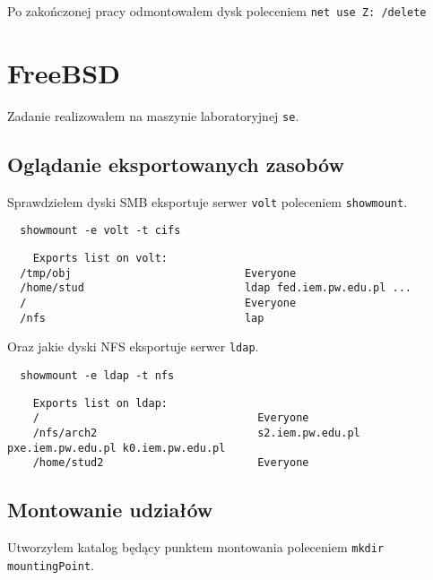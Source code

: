 \documentclass{article} %
\begin{document}
Po zakończonej pracy odmontowałem dysk poleceniem \texttt{net use Z: /delete}

\section{FreeBSD}
Zadanie realizowałem na maszynie laboratoryjnej \texttt{se}.

\subsection{Oglądanie eksportowanych zasobów}
Sprawdziełem dyski SMB eksportuje serwer \texttt{volt} poleceniem \texttt{showmount}.

\begin{tcolorbox}[colback=yellow!10!white,colframe=red!45!black,coltitle=yellow!100!black, title=FreeBSD]
  \begin{lstlisting}
  showmount -e volt -t cifs
  \end{lstlisting}
  \tcblower
  \tiny
  \begin{lstlisting}
    Exports list on volt:
  /tmp/obj                           Everyone
  /home/stud                         ldap fed.iem.pw.edu.pl ...
  /                                  Everyone
  /nfs                               lap
  \end{lstlisting}
\end{tcolorbox}
\normalsize

\vspace{1cm}
Oraz jakie dyski NFS eksportuje serwer \texttt{ldap}.
\begin{tcolorbox}[colback=yellow!10!white,colframe=red!45!black,coltitle=yellow!100!black, title=FreeBSD]
  \begin{lstlisting}
  showmount -e ldap -t nfs
  \end{lstlisting}
  \tcblower
  \tiny
  \begin{lstlisting}
    Exports list on ldap:
    /                                  Everyone
    /nfs/arch2                         s2.iem.pw.edu.pl pxe.iem.pw.edu.pl k0.iem.pw.edu.pl  
    /home/stud2                        Everyone
  \end{lstlisting}
\end{tcolorbox}
\normalsize

\subsection{Montowanie udziałów}
Utworzyłem katalog będący punktem montowania poleceniem \texttt{mkdir mountingPoint}.
\end{document}
